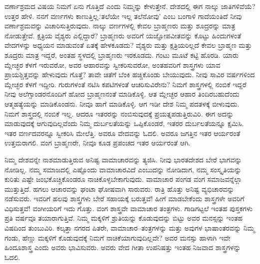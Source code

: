 ವರ್ಣಾಶ್ರಮದ ವಿಷಯ ನಿಮಗೆ ಏನು ಗೊತ್ತಿದೆ ಎಂದು ನಿಮ್ಮನ್ನು ಕೇಳುತ್ತೇನೆ. ದೇಶದಲ್ಲಿ ಈಗ ನಾಲ್ಕು ಜಾತಿಗಳಿವೆಯೆ? ಉತ್ತರ ಹೇಳಿ. ನನಗೆ ವರ್ಣಗಳು ಕಾಣುತ್ತಿಲ್ಲ.\break ‘ತಲೆಯೇ ಇಲ್ಲ ತಲೆನೋವು’ ಎಂಬ ಬಂಗಾಳಿ ಗಾದೆಯಂತಿದೆ ನೀವು ವರ್ಣಾಶ್ರಮವನ್ನು ವಿಚಾರಿಸುತ್ತಿರುವುದು. ನಾಲ್ಕು ವರ್ಣಗಳಲ್ಲಿ ಕೇವಲ ಬ್ರಾಹ್ಮಣರು ಮತ್ತು ಶೂದ್ರರನ್ನು ಮಾತ್ರ ನೋಡುತ್ತೇವೆ. ಕ್ಷತ್ರಿಯ ವೈಶ್ಯರು ಎಲ್ಲಿದ್ದಾರೆ? ಬ್ರಾಹ್ಮಣರು ಅವರಿಗೆ ಯಜ್ಞೋಪವೀತವನ್ನು ಕೊಟ್ಟು ಹಿಂದುಗಳಂತೆ ವೇದಗಳನ್ನು ಅಧ್ಯಯನ ಮಾಡುವಂತೆ ಏತಕ್ಕೆ ಹೇಳಕೂಡದು? ವೈಶ್ಯರು ಮತ್ತು ಕ್ಷತ್ರಿಯರಿಲ್ಲದೆ ಕೇವಲ ಬ್ರಾಹ್ಮಣ ಮತ್ತು ಶೂದ್ರರು ಮಾತ್ರ ಇದ್ದರೆ, ಅಂತಹ ಸ್ಥಳದಲ್ಲಿ ಬ್ರಾಹ್ಮಣರು ಇರಕೂಡದು. ಗಂಟು ಮೂಟೆ ಕಟ್ಟಿ ಹೊರಡಿ. ಯಾರು ಮ್ಲೇಚ್ಛರ ಕೆಳಗೆ ಇರುವರೋ, ಅವರ ಆಹಾರವನ್ನು ಸ್ವೀಕರಿಸುವರೋ, ಅಂತಹವರಿಗೆ ಶಾಸ್ತ್ರಗಳು ಯಾವ ಪ್ರಾಯಶ್ಚಿತ್ತವನ್ನು ಹೇಳುವುದು ಗೊತ್ತೆ? ತಾವೇ ಚಿತೆಗೆ ಬೆಂಕಿ ಹಚ್ಚಿಕೊಂಡು ಬೇಯುವುದು. ನೀವು ಸಾವಿರ ವರ್ಷಗಳಿಂದ ಮ್ಲೇಚ್ಛರ ಕೆಳಗೆ ಇದ್ದೀರಿ. ಗುರುಗಳಂತೆ ನಟಿಸಿ ಕಪಟಿಗಳಂತೆ ಆಚರಿಸುವಿರೇನು? ನಿಮಗೆ ಶಾಸ್ತ್ರಗಳಲ್ಲಿ ನಂಬಿಕೆ ಇದ್ದರೆ ನೀವು ಅಲೆಗ್ಸಾಂಡರನೊಂದಿಗೆ ಹೋದ ಬ್ರಾಹ್ಮಣನಂತೆ ಮಾಡಿಕೊಳ್ಳಿ. ಆತ ಮ್ಲೇಚ್ಛರ ಆಹಾರ ತಿಂದಿರಬಹುದೆಂದು ಆತ್ಮಹತ್ಯೆಯನ್ನು ಮಾಡಿಕೊಂಡನು. ನೀವೂ ಹಾಗೆ ಮಾಡಿಕೊಳ್ಳಿ. ಆಗ ಇಡೀ ದೇಶ ನಿಮ್ಮ ಪದತಳಕ್ಕೆ ಬೀಳುವುದು. ನಿಮಗೆ ಶಾಸ್ತ್ರದಲ್ಲಿ ನಂಬಿಕೆ ಇಲ್ಲ. ಆದರೂ ಇತರರನ್ನು ನಂಬಿಸುವುದಕ್ಕೆ ಪ್ರಯತ್ನಪಡುತ್ತಿರುವಿರಿ. ಈಗ ಅದನ್ನು ಮಾಡುವುದಕ್ಕೆ ಆಗುವುದಿಲ್ಲವೆಂದು ನಿಮ್ಮ ದುರ್ಬಲತೆಯನ್ನು ಒಪ್ಪಿಕೊಂಡರೆ, ಇತರರ ದುರ್ಬಲತೆಯನ್ನೂ ಕ್ಷಮಿಸಿ. ಇತರ ವರ್ಣದವರನ್ನೂ ಸ್ವೀಕರಿಸಿ ಮೇಲೆತ್ತಿ. ಅವರೂ ವೇದವನ್ನು ಓದಲಿ. ಅವರೂ ಜಗತ್ತಿನ ಇತರ ಆರ್ಯರಂತೆ ಉತ್ತಮರಾಗಲಿ. ವಂಗ ಬ್ರಾಹ್ಮಣರೇ, ನೀವೂ ಕೂಡ ಪ್ರಪಂಚದ ಇತರ ಆರ್ಯರಂತೆ ಆಗಿ.

ನಿಮ್ಮ ದೇಶವನ್ನೇ ನಾಶಮಾಡುತ್ತಿರುವ ಅನಿಷ್ಟ ವಾಮಾಚಾರವನ್ನು ತ್ಯಜಿಸಿ. ನೀವು ಭಾರತದೇಶದ ಬೇರೆ ಭಾಗವನ್ನು ನೋಡಿಲ್ಲ. ನಮ್ಮ ಸಮಾಜದಲ್ಲಿ ಎಷ್ಟೊಂದು ವಾಮಾಚಾರವಿದೆ ಎಂಬುದನ್ನು ನೋಡಿದಾಗ, ನಮ್ಮ ಸಂಸ್ಕೃತಿಯನ್ನು ಕುರಿತು ಎಷ್ಟೇ ಜಂಭಕೊಚ್ಚಿಕೊಂಡರೂ ನಾಚಿಕೊಳ್ಳಬೇಕಾಗುವುದು. ವಾಮಾಚಾರ ಪಂಗಡ ವಂಗ ಸಮಾಜವನ್ನೆಲ್ಲಾ ಮುತ್ತುತ್ತಿದೆ. ಹಗಲು ಆಚಾರವನ್ನು ಘಂಟಾ ಘೋಷವಾಗಿ ಸಾರುವರು. ರಾತ್ರಿ ಹೊತ್ತು ಅನಿಷ್ಟ ವ್ಯಭಿಚಾರವನ್ನು ನಡೆಸುವರು. ಇವರಿಗೆ ಹಲವು ಶಾಸ್ತ್ರಗಳು ಬೇರೆ ಸಹಾಯಕ್ಕೆ ಬರುತ್ತವೆ! ಹೀಗೆ ಮಾಡಬೇಕೆಂದು ಶಾಸ್ತ್ರಗಳೇ ಅವರಿಗೆ ವಿಧಿಸುತ್ತವೆ! ವಂಗೀಯರಿಗೆ ಇದು ಗೊತ್ತು. ವಂಗ ಶಾಸ್ತ್ರವೇ ವಾಮಾಚಾರ ತಂತ್ರಗಳು. ಗಾಡಿಗಟ್ಟಲೆ ಇಂತಹ ಪುಸ್ತಕಗಳು ಪ್ರತಿ ವರ್ಷವೂ ತಯಾರಾಗುತ್ತಿವೆ. ನಿಮ್ಮ ಮಕ್ಕಳಿಗೆ ಶ್ರುತಿಯನ್ನು ಕೊಡುವುದನ್ನು ಬಿಟ್ಟು ಅವರ ಮನಸ್ಸನ್ನು ಇಂತಹ ವಿಷದಿಂದ ತುಂಬುವಿರಿ. ಕಲ್ಕತ್ತಾ ನಗರದ ಪಿತರೇ, ವಾಮಾಚಾರ–ತಂತ್ರಗಳನ್ನು ಮತ್ತು ಅವುಗಳ ಭಾಷಾಂತರವನ್ನು ನಿಮ್ಮ ಗಂಡು, ಹೆಣ್ಣು ಮಕ್ಕಳಿಗೆ ಕೊಡುವುದಕ್ಕೆ ನಿಮಗೆ ನಾಚಿಕೆಯಾಗುವುದಿಲ್ಲವೇ? ಅವರ ಮನಸ್ಸು ಹಾಳಾಗಿ ಇವೇ ಹಿಂದೂಶಾಸ್ತ್ರ ಎಂದು ಅವರು ಭಾವಿಸುವರು. ಅವರು ವೇದ ಗೀತಾ ಉಪನಿಷತ್ತು ಇಂತಹ ನಿಜವಾದ ಶಾಸ್ತ್ರಗಳನ್ನು ಓದಲಿ.

